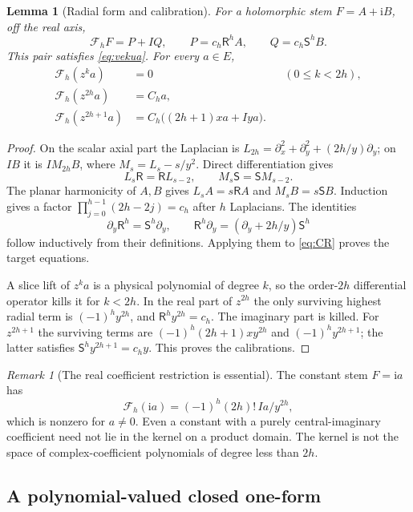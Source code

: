 \documentclass[11pt,a4paper]{article}
\numberwithin{equation}{section}
\newtheorem{lemma}[theorem]{Lemma}
\theoremstyle{definition}
\theoremstyle{remark}
\newtheorem{remark}[theorem]{Remark}
\newcommand{\ii}{\mathrm i}
\newcommand{\Fu}{\mathcal F_h}
\newcommand{\Rop}{\mathsf R}
\newcommand{\Sop}{\mathsf S}
\begin{document}
\begin{lemma}[Radial form and calibration]\label{lem:radial}
For a holomorphic stem $F=A+\ii B$, off the real axis,
\begin{equation}\label{eq:radial}
 \Fu F=P+IQ,\qquad P=c_h\Rop^hA,\qquad Q=c_h\Sop^hB.
\end{equation}
This pair satisfies \eqref{eq:vekua}. For every $a\in E$,
\begin{align}
 \Fu(z^ka)&=0 &&(0\le k<2h),\label{eq:cal-low}\\
 \Fu(z^{2h}a)&=C_ha,\label{eq:cal-even}\\
 \Fu(z^{2h+1}a)&=C_h\bigl((2h+1)xa+Iya\bigr).\label{eq:cal-odd}
\end{align}
\end{lemma}
\begin{proof}
On the scalar axial part the Laplacian is
$L_{2h}=\partial_x^2+\partial_y^2+(2h/y)\partial_y$; on $IB$ it is
$I M_{2h}B$, where $M_s=L_s-s/y^2$. Direct differentiation gives
\[
 L_s\Rop=\Rop L_{s-2},\qquad M_s\Sop=\Sop M_{s-2}.
\]
The planar harmonicity of $A,B$ gives $L_sA=s\Rop A$ and
$M_sB=s\Sop B$. Induction gives a factor
$\prod_{j=0}^{h-1}(2h-2j)=c_h$ after $h$ Laplacians. The identities
\[
 \partial_y\Rop^h=\Sop^h\partial_y,
 \qquad \Rop^h\partial_y=(\partial_y+2h/y)\Sop^h
\]
follow inductively from their definitions. Applying them to \eqref{eq:CR}
proves the target equations.

A slice lift of $z^ka$ is a physical polynomial of degree $k$, so the
order-$2h$ differential operator kills it for $k<2h$. In the real part of
$z^{2h}$ the only surviving highest radial term is $(-1)^hy^{2h}$, and
$\Rop^hy^{2h}=c_h$. The imaginary part is killed. For $z^{2h+1}$ the
surviving terms are $(-1)^h(2h+1)xy^{2h}$ and $(-1)^hy^{2h+1}$; the latter
satisfies $\Sop^hy^{2h+1}=c_hy$. This proves the calibrations.
\end{proof}

\begin{remark}[The real coefficient restriction is essential]
The constant stem $F=\ii a$ has
\[
 \Fu(\ii a)=(-1)^h(2h)!\,Ia/y^{2h},
\]
which is nonzero for $a\ne0$. Even a constant with a purely central-imaginary
coefficient need not lie in the kernel on a product domain. The kernel is
not the space of complex-coefficient polynomials of degree less than $2h$.
\end{remark}

\subsection{A polynomial-valued closed one-form}
\end{document}
